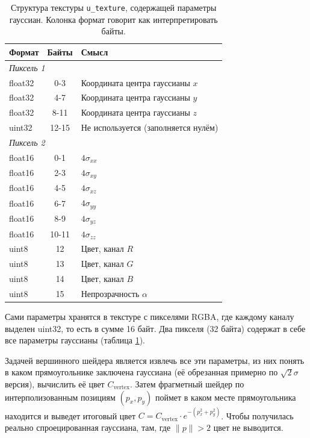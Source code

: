 \begin{table}[htbp]
	\centering
	\begin{tabularx}{\textwidth}{lcX}
		\toprule
		\textbf{Формат} &
		\textbf{Байты} &
		\textbf{Смысл} \\
		\midrule
		\multicolumn{3}{l}{\textit{Пиксель 1}} \\
		
		float32 &
		0-3 &
		Координата центра гауссианы $x$ \\
		
		float32 &
		4-7 &
		Координата центра гауссианы $y$ \\
		
		float32 &
		8-11 &
		Координата центра гауссианы $z$ \\
		
		uint32 &
		12-15 &
		Не используется (заполняется нулём) \\
		
		\midrule
		\multicolumn{3}{l}{\textit{Пиксель 2}} \\
		
		float16 &
		0-1 &
		$4\sigma_{xx}$ \\
		
		float16 &
		2-3 &
		$4\sigma_{xy}$ \\
		
		float16 &
		4-5 &
		$4\sigma_{xz}$ \\
		
		float16 &
		6-7 &
		$4\sigma_{yy}$ \\
		
		float16 &
		8-9 &
		$4\sigma_{yz}$ \\
		
		float16 &
		10-11 &
		$4\sigma_{zz}$ \\
		
		uint8 &
		12 &
		Цвет, канал $R$ \\
		
		uint8 &
		13 &
		Цвет, канал $G$ \\
		
		uint8 &
		14 &
		Цвет, канал $B$ \\
		
		uint8 &
		15 &
		Непрозрачность $\alpha$ \\
		
		\bottomrule
	\end{tabularx}
	\caption{Структура текстуры \texttt{u\_texture}, содержащей параметры гауссиан. Колонка формат говорит как интерпретировать байты.}
	\label{tab:gaussian_texture}
\end{table}

Сами параметры хранятся в текстуре с пикселями RGBA, где каждому каналу выделен uint32, то есть в сумме 16 байт. Два пикселя (32 байта) содержат в себе все параметры гауссианы (таблица \ref{tab:gaussian_texture}).

Задачей вершинного шейдера является извлечь все эти параметры, из них понять в каком прямоугольнике заключена гауссиана (её обрезанная примерно по $\sqrt2 \sigma$ версия), вычислить её цвет $C_\text{vertex}$. Затем фрагметный шейдер по интерполизованным позициям $(p_x, p_y)$ поймет в каком месте прямоугольника находится и выведет итоговый цвет $C = C_\text{vertex} \cdot e^{-(p_x^2 + p_y^2)}$. Чтобы получилась реально спроецированная гауссиана, там, где $\|p\|>2$ цвет не выводится.